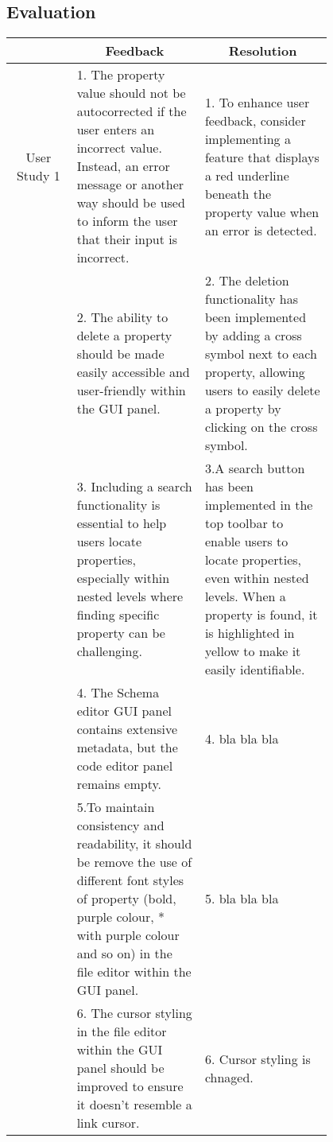 \subsection{Evaluation} %
\begin{table*}
    \vspace{-10pt}
    \centering
    \small %
    \setlength{\extrarowheight}{5pt} %
    \renewcommand{\arraystretch}{1.5} %
    \begin{tabular}{|c|p{0.4\linewidth}|p{0.4\linewidth}|}
        \hline
        \multicolumn{1}{|c|}{\multirow{2}{*}{}} & \multicolumn{1}{|c|}{Feedback} & \multicolumn{1}{|c|}{Resolution} \\
        \cline{2-3}
        \hline
        User Study 1 & 1. The property value should not be autocorrected if the user enters an incorrect value. Instead, an error message or another way should be used to inform the user that their input is incorrect. & 1. To enhance user feedback, consider implementing a feature that displays a red underline beneath the property value when an error is detected. \\
        \cline{2-3}
        & 2. The ability to delete a property should be made easily accessible and user-friendly within the GUI panel. & 2. The deletion functionality has been implemented by adding a cross symbol next to each property, allowing users to easily delete a property by clicking on the cross symbol. \\
        \cline{2-3}
        & 3. Including a search functionality is essential to help users locate properties, especially within nested levels where finding specific property can be challenging. & 3.A search button has been implemented in the top toolbar to enable users to locate properties, even within nested levels. When a property is found, it is highlighted in yellow to make it easily identifiable. \\
        \cline{2-3}
        & 4. The Schema editor GUI panel contains extensive metadata, but the code editor panel remains empty. & 4. bla bla bla \\
        \cline{2-3}
        & 5.To maintain consistency and readability, it should be remove the use of different font styles of property (bold, purple colour, * with purple colour and so on)  in the file editor within the GUI panel. & 5. bla bla bla \\
        \cline{2-3}
        & 6. The cursor styling in the file editor within the GUI panel should be improved to ensure it doesn't resemble a link cursor. & 6. Cursor styling is chnaged. \\

\end{tabular}
\end{table*}
